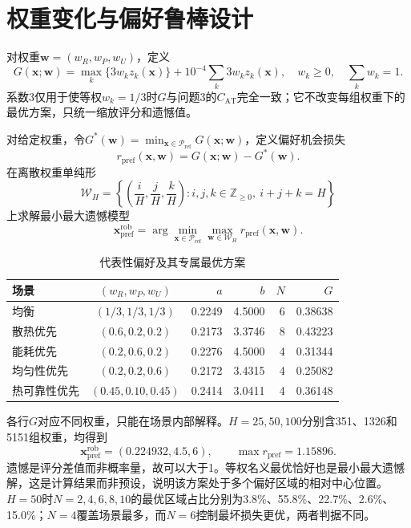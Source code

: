 \documentclass[UTF8,12pt,a4paper]{ctexart}
\begin{document}
\section{权重变化与偏好鲁棒设计}

对权重$\bm w=(w_R,w_P,w_U)$，定义
\begin{equation}
G(\bm x;\bm w)=\max_k\{3w_kz_k(\bm x)\}
+10^{-4}\sum_k3w_kz_k(\bm x),\quad w_k\ge0,\quad\sum_kw_k=1.
\end{equation}
系数3仅用于使等权$w_k=1/3$时$G$与问题3的$C_{\mathrm{AT}}$完全一致；它不改变每组权重下的最优方案，只统一缩放评分和遗憾值。

对给定权重，令$G^*(\bm w)=\min_{\bm x\in\mathcal P_{\mathrm{ref}}}G(\bm x;\bm w)$，定义偏好机会损失
\begin{equation}
r_{\mathrm{pref}}(\bm x,\bm w)=G(\bm x;\bm w)-G^*(\bm w).
\end{equation}
在离散权重单纯形
\begin{equation}
\mathcal W_H=\left\{\left(\frac{i}{H},\frac{j}{H},\frac{k}{H}\right):
i,j,k\in\mathbb Z_{\ge0},\ i+j+k=H\right\}
\end{equation}
上求解最小最大遗憾模型
\begin{equation}
\bm x_{\mathrm{pref}}^{\mathrm{rob}}=
\arg\min_{\bm x\in\mathcal P_{\mathrm{ref}}}
\max_{\bm w\in\mathcal W_H}r_{\mathrm{pref}}(\bm x,\bm w).
\end{equation}

\begin{table}[H]\centering\small
\caption{代表性偏好及其专属最优方案}
\begin{tabular}{lcrrrr}
\toprule
场景&$(w_R,w_P,w_U)$&$a$&$b$&$N$&$G$\\\midrule
均衡&$(1/3,1/3,1/3)$&0.2249&4.5000&6&0.38638\\
散热优先&$(0.6,0.2,0.2)$&0.2173&3.3746&8&0.43223\\
能耗优先&$(0.2,0.6,0.2)$&0.2276&4.5000&4&0.31344\\
均匀性优先&$(0.2,0.2,0.6)$&0.2172&3.4315&4&0.25082\\
热可靠性优先&$(0.45,0.10,0.45)$&0.2414&3.0411&4&0.36148\\
\bottomrule
\end{tabular}
\end{table}
各行$G$对应不同权重，只能在场景内部解释。$H=25,50,100$分别含351、1326和5151组权重，均得到
\begin{equation}
\boxed{\bm x_{\mathrm{pref}}^{\mathrm{rob}}=(0.224932,4.5,6)},\qquad
\max r_{\mathrm{pref}}=1.15896.
\end{equation}
遗憾是评分差值而非概率量，故可以大于1。等权名义最优恰好也是最小最大遗憾解，这是计算结果而非预设，说明该方案处于多个偏好区域的相对中心位置。$H=50$时$N=2,4,6,8,10$的最优区域占比分别为3.8\%、55.8\%、22.7\%、2.6\%、15.0\%；$N=4$覆盖场景最多，而$N=6$控制最坏损失更优，两者判据不同。
\end{document}
